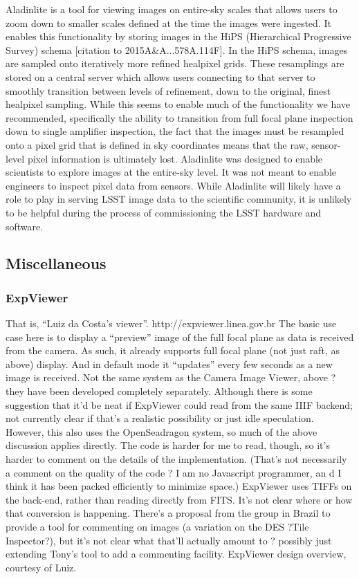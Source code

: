 Aladinlite is a tool for viewing images on entire-sky scales that allows users
to zoom down to smaller scales defined at the time the images were ingested.
It enables this functionality by storing images in the HiPS (Hierarchical
Progressive Survey) schema [citation to 2015A\&A...578A.114F].  In the HiPS
schema, images are sampled onto iteratively more refined healpixel grids.  These
resamplings are stored on a central server which allows users connecting to that
server to smoothly transition between levels of refinement, down to the
original, finest healpixel sampling.  While this seems to enable much of the
functionality we have recommended, specifically the ability to transition from
full focal plane inspection down to single amplifier inspection, the fact that
the images must be resampled onto a pixel grid that is defined in sky
coordinates means that the raw, sensor-level pixel information is ultimately
lost.  Aladinlite was designed to enable scientists to explore images at the
entire-sky level.  It was not meant to enable engineers to inspect pixel data
from sensors.  While Aladinlite will likely have a role to play in serving LSST
image data to the scientific community, it is unlikely to be helpful during the
process of commissioning the LSST hardware and software.

\subsection{Miscellaneous}
\subsubsection{ExpViewer}
That is, ``Luiz da Costa's viewer''.
http://expviewer.linea.gov.br
The basic use case here is to display a ``preview'' image of the full focal plane as data is received from the camera.
As such, it already supports full focal plane (not just raft, as above) display.
And in default mode it ``updates'' every few seconds as a new image is received.
Not the same system as the Camera Image Viewer, above ? they have been developed completely separately.
Although there is some suggestion that it'd be neat if ExpViewer could read from the same IIIF backend; not currently clear if that's a realistic possibility or just idle speculation.
However, this also uses the OpenSeadragon system, so much of the above discussion applies directly.
The code is harder for me to read, though, so it's harder to comment on the details of the implementation.
(That's not necessarily a comment on the quality of the code ? I am no Javascript programmer, an
d I think it has been packed efficiently to minimize space.)
ExpViewer uses TIFFs on the back-end, rather than reading directly from FITS.
It's not clear where or how that conversion is happening.
There's a proposal from the group in Brazil to provide a tool for commenting on images (a variation on the DES ?Tile Inspector?), but it's not clear what that'll actually amount to ? possibly just extending Tony's tool to add a commenting facility.
ExpViewer design overview, courtesy of Luiz.

